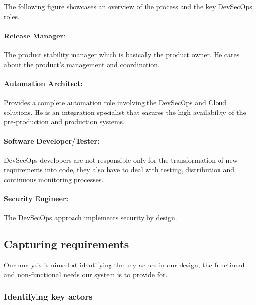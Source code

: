 \hspace{7mm}The following figure showcases an overview of the process and the key DevSecOps roles. 

\paragraph{Release Manager:} 
\hspace{7mm}The product stability manager which is basically the product owner. He cares about the product’s management and coordination. 

\paragraph{Automation Architect: }
\hspace{7mm}Provides a complete automation role involving the DevSecOps and Cloud solutions. He is an integration specialist that ensures the high availability of the pre-production and production systems. 

\paragraph{Software Developer/Tester:}
\hspace{7mm}DevSecOps developers are not responsible only for the transformation of new requirements into code, they also have to deal with testing, distribution and continuous monitoring processes.

\paragraph{Security Engineer: }
\hspace{7mm}The DevSecOps approach implements security by design.

\newpage 

\subsection{Capturing requirements}

\hspace{7mm}Our analysis is aimed at identifying the key actors in our design, the functional and non-functional needs our system is to provide for.

\subsubsection{Identifying key actors}

